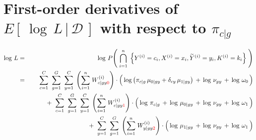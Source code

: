 

\section{First-order derivatives of $E\!\left[\,\left.\log\,L\,\right\vert\,\mathcal{D}\,\right]$ with respect to $\pi_{c \vert g}$}
\setcounter{theorem}{0}
\setcounter{equation}{0}

\renewcommand{\theenumi}{\roman{enumi}}
\renewcommand{\labelenumi}{\textnormal{(\theenumi)}$\;\;$}

\begin{eqnarray*}
\log\,L
	&=&
	\log\,P\!\left(\;
		\overset{n}{\underset{i=1}{\bigcap}}\;
		\left\{
			Y^{(i)}=c_{i},X^{(i)}=x_{i},\widetilde{Y}^{(i)}=y_{i},K^{(i)}=k_{i}
		\right\}
	\;\right)
\\
&=&
	{\color{white}+} \;\;
	\overset{C}{\underset{c=1}{\sum}}\;\;
	\overset{G}{\underset{g=1}{\sum}}\;\;
	\overset{C}{\underset{y=1}{\sum}}\;
	\left(\overset{n}{\underset{i=1}{\sum}}\;W^{(i)}_{c \vert gy{\color{red}0}}\right)
	\cdot
	\left(\,
		\log\left(\pi_{c \vert g}\,\mu_{0 \vert gy} + \delta_{cy}\,\mu_{1\vert gy}\right)
		\,\overset{{\color{white}.}}{+}\,
		\log\,\nu_{gy}
		\,\overset{{\color{white}.}}{+}\,
		\log\,\omega_{0}
	\,\right)
\\
&&
	+ \;\;
	\overset{C}{\underset{c=1}{\sum}}\;\;
	\overset{G}{\underset{g=1}{\sum}}\;\;
	\overset{C}{\underset{y=1}{\sum}}\;
	\left(\overset{n}{\underset{i=1}{\sum}}\;W^{(i)}_{c \vert gy{\color{red}1}}\right)
	\cdot
	\left(\,
		\log\,\pi_{c \vert g}
		\,\overset{{\color{white}.}}{+}\,
		\log\,\mu_{0\vert gy}
		\,\overset{{\color{white}.}}{+}\,
		\log\,\nu_{gy}
		\,\overset{{\color{white}.}}{+}\,
		\log\,\omega_{1}
	\,\right)
\\
&&
	+ \;\;
	\overset{C}{\underset{y=1}{\sum}}\;\;
	\overset{G}{\underset{g=1}{\sum}}\;
	\left(\overset{n}{\underset{i=1}{\sum}}\;W^{(i)}_{y \vert gy{\color{red}2}}\right)
	\cdot
	\left(\,
		\log\,\mu_{1 \vert gy}
		\,\overset{{\color{white}.}}{+}\,
		\log\,\nu_{gy}
		\,\overset{{\color{white}.}}{+}\,
		\log\,\omega_{1}
	\,\right)
\end{eqnarray*}


